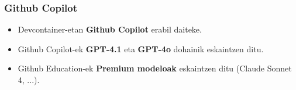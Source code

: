 \documentclass[lang=eu,biz=foe,aspectratio=169,handout]{mupresentation}
\begin{document}
\begin{frame}
  \frametitle{Github Copilot}
  \begin{itemize}
    \item Devcontainer-etan \textbf{Github Copilot} erabil daiteke.
    \item Github Copilot-ek \textbf{GPT-4.1} eta \textbf{GPT-4o} dohainik eskaintzen ditu.
    \item Github Education-ek \textbf{Premium modeloak} eskaintzen ditu (Claude Sonnet 4, ...).
  \end{itemize}
\end{frame}

\end{document}
